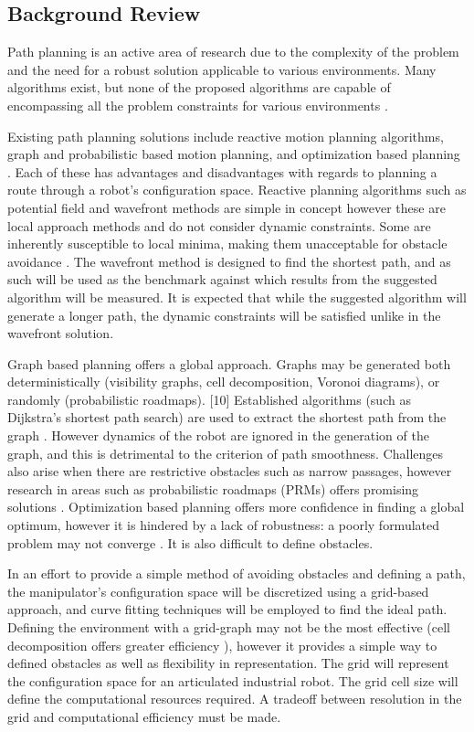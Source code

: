\documentclass[twoside,letter,10pt]{article}
\begin{document}
\begin{multicols}{2}
\section{Background Review}

Path planning is an active area of research due to the complexity of the problem and the need for a robust solution applicable to various environments. Many algorithms exist, but none of the proposed algorithms are capable of encompassing all the problem constraints for various environments \cite{sariff06}.

Existing path planning solutions include reactive motion planning algorithms, graph and probabilistic based motion planning, and optimization based planning \cite{waslanderI}. Each of these has advantages and disadvantages with regards to planning a route through a robot's configuration space. Reactive planning algorithms such as potential field and wavefront methods are simple in concept however these are local approach methods and do not consider dynamic constraints. Some are inherently susceptible to local minima, making them unacceptable for obstacle avoidance \cite{koren91}. The wavefront method is designed to find the shortest path, and as such will be used as the benchmark against which results from the suggested algorithm will be measured. It is expected that while the suggested algorithm will generate a longer path, the dynamic constraints will be satisfied unlike in the wavefront solution.

Graph based planning offers a global approach. Graphs may be generated both deterministically (visibility graphs, cell decomposition, Voronoi diagrams), or randomly (probabilistic roadmaps). [10] Established algorithms (such as Dijkstra's shortest path search) are used to extract the shortest path from the graph \cite{dijkstra59}. However dynamics of the robot are ignored in the generation of the graph, and this is detrimental to the criterion of path smoothness. Challenges also arise when there are restrictive obstacles such as narrow passages, however research in areas such as probabilistic roadmaps (PRMs) offers promising solutions \cite{hsu03}. Optimization based planning offers more confidence in finding a global optimum, however it is hindered by a lack of robustness: a poorly formulated problem may not converge \cite{waslanderIII}. It is also difficult to define obstacles.

In an effort to provide a simple method of avoiding obstacles and defining a path, the manipulator's configuration space will be discretized using a grid-based approach, and curve fitting techniques will be employed to find the ideal path. Defining the environment with a grid-graph may not be the most effective (cell decomposition offers greater efficiency \cite{lingelbach04}), however it provides a simple way to defined obstacles as well as flexibility in representation. The grid will represent the configuration space for an articulated industrial robot. The grid cell size will define the computational resources required. A tradeoff between resolution in the grid and computational efficiency must be made.


\end{multicols}
\end{document}
